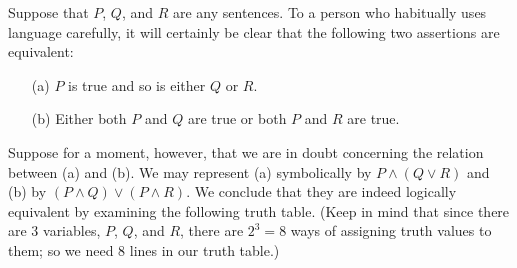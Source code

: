 \begin{exam} Suppose that $P$, $Q$, and $R$ are any sentences. To a person who habitually uses
language carefully, it will certainly be clear that the following two assertions are
equivalent:
 \begin{enumerate}
   \item[(a)] $P$ is true and so is either $Q$ or $R$.
   \item[(b)] Either both $P$ and $Q$ are true or both $P$ and $R$ are
true.
 \end{enumerate}
Suppose for a moment, however, that we are in doubt concerning the relation between (a) and
(b).  We may represent (a) symbolically by $P \land (Q \lor R)$ and (b) by $(P \land Q) \lor
(P \land R)$.  We conclude that they are indeed logically equivalent by examining the
following truth table.  (Keep in mind that since there are 3 variables, $P$, $Q$, and $R$,
there are $2^3 = 8$ ways of assigning truth values to them; so we need 8 lines in our truth
table.)




\end{exam}
